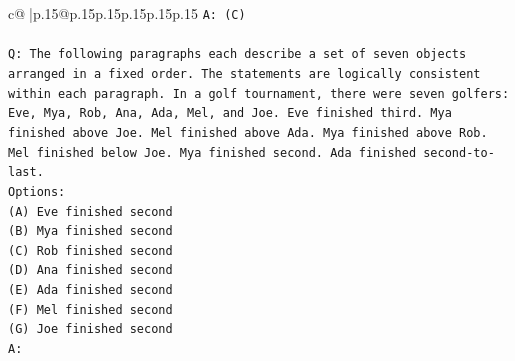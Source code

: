 \documentclass{article}
\begin{document}
{\begin{supertabular}{c@{$\;$}|p{.15\linewidth}@{}p{.15\linewidth}p{.15\linewidth}p{.15\linewidth}p{.15\linewidth}p{.15\linewidth}}
{{{\texttt{A: (C)} \\
\\ 
\texttt{Q: The following paragraphs each describe a set of seven objects arranged in a fixed order. The statements are logically consistent within each paragraph. In a golf tournament, there were seven golfers: Eve, Mya, Rob, Ana, Ada, Mel, and Joe. Eve finished third. Mya finished above Joe. Mel finished above Ada. Mya finished above Rob. Mel finished below Joe. Mya finished second. Ada finished second{-}to{-}last.} \\
\texttt{Options:} \\
\texttt{(A) Eve finished second} \\
\texttt{(B) Mya finished second} \\
\texttt{(C) Rob finished second} \\
\texttt{(D) Ana finished second} \\
\texttt{(E) Ada finished second} \\
\texttt{(F) Mel finished second} \\
\texttt{(G) Joe finished second} \\
\texttt{A:} \\
            }
        }
    }
     \\ \\


\end{supertabular}}
\end{document}
